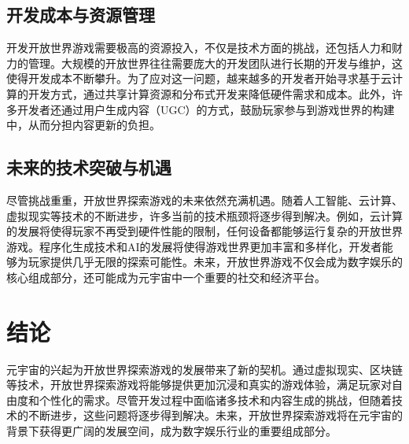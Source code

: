 \documentclass[UTF8]{ctexart}
\begin{document}
	\subsection{开发成本与资源管理}
	
	开发开放世界游戏需要极高的资源投入，不仅是技术方面的挑战，还包括人力和财力的管理。大规模的开放世界往往需要庞大的开发团队进行长期的开发与维护，这使得开发成本不断攀升。为了应对这一问题，越来越多的开发者开始寻求基于云计算的开发方式，通过共享计算资源和分布式开发来降低硬件需求和成本\cite{yang2022cloudgaming}。此外，许多开发者还通过用户生成内容（UGC）的方式，鼓励玩家参与到游戏世界的构建中，从而分担内容更新的负担。
	
	\subsection{未来的技术突破与机遇}
	
	尽管挑战重重，开放世界探索游戏的未来依然充满机遇。随着人工智能、云计算、虚拟现实等技术的不断进步，许多当前的技术瓶颈将逐步得到解决。例如，云计算的发展将使得玩家不再受到硬件性能的限制，任何设备都能够运行复杂的开放世界游戏。程序化生成技术和AI的发展将使得游戏世界更加丰富和多样化，开发者能够为玩家提供几乎无限的探索可能性。未来，开放世界游戏不仅会成为数字娱乐的核心组成部分，还可能成为元宇宙中一个重要的社交和经济平台\cite{park2021metaverse}。
	
	
	\section{结论}
	元宇宙的兴起为开放世界探索游戏的发展带来了新的契机。通过虚拟现实、区块链等技术，开放世界探索游戏将能够提供更加沉浸和真实的游戏体验，满足玩家对自由度和个性化的需求。尽管开发过程中面临诸多技术和内容生成的挑战，但随着技术的不断进步，这些问题将逐步得到解决。未来，开放世界探索游戏将在元宇宙的背景下获得更广阔的发展空间，成为数字娱乐行业的重要组成部分。
	
\end{document}

